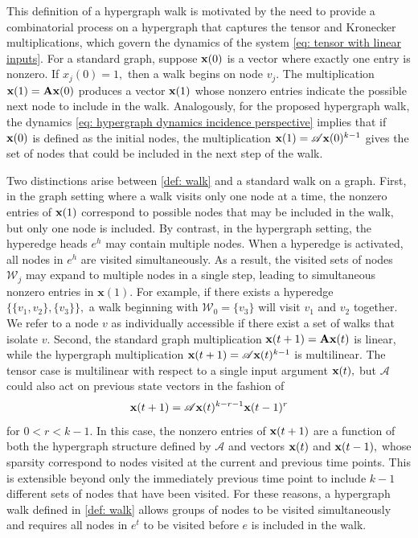 \documentclass[journal,twoside,web]{ieeecolor}
\begin{document}
This definition of a hypergraph walk is motivated by the need to provide a combinatorial process on a hypergraph that captures the tensor and Kronecker multiplications, which govern the dynamics of the system \eqref{eq: tensor with linear inputs}.
%
For a standard graph, suppose $\textbf x(0)$ is a vector where exactly one entry is nonzero. If $x_j(0)=1,$ then a walk begins on node $v_j.$ The multiplication $\textbf x(1)=\textbf{A}\textbf x(0)$ produces a vector $\textbf x(1)$ whose nonzero entries indicate the possible next node to include in the walk.
%
Analogously, for the proposed hypergraph walk, the dynamics \eqref{eq: hypergraph dynamics incidence perspective} implies that if $\textbf x(0)$ is defined as the initial nodes, the multiplication $\textbf x(1)=\mathscr{A}\textbf x(0)^{k-1}$ gives the set of nodes that could be included in the next step of the walk.



Two distinctions arise between \cref{def: walk} and a standard walk on a graph.
%
First, in the graph setting where a walk visits only one node at a time, the nonzero entries of $\textbf x(1)$ correspond to possible nodes that may be included in the walk, but only one node is included.
%
By contrast, in the hypergraph setting, the hyperedge heads $e^{h}$ may contain multiple nodes.
%
When a hyperedge is activated, all nodes in $e^{h}$ are visited simultaneously. As a result, the visited sets of nodes $\mathcal{W}_j$ may expand to multiple nodes in a single step, leading to simultaneous nonzero entries in $\textbf{x}(1)$.
%
For example, if there exists a hyperedge $\{\{v_1, v_2\}, \{v_3\}\},$ a walk beginning with $\mathcal{W}_0=\{v_3\}$ will visit $v_1$ and $v_2$ together.
%
We refer to a node $v$ as individually accessible if there exist a set of walks that isolate $v.$
%
Second, the standard graph multiplication $\textbf x(t+1)=\textbf{A}\textbf x(t)$ is linear, while the hypergraph multiplication $\textbf x(t+1)=\mathscr{A}\textbf x(t)^{k-1}$ is multilinear.
%
The tensor case is multilinear with respect to a single input argument $\textbf x(t),$ but $\mathscr{A}$ could also act on previous state vectors in the fashion of \[\textbf x(t+1)=\mathscr{A}\textbf x(t)^{k-r-1}\textbf x(t-1)^r\] for $0<r<k-1.$
%
In this case, the nonzero entries of $\textbf x(t+1)$ are a function of both the hypergraph structure defined by $\mathscr{A}$ and vectors $\textbf x(t)$ and $\textbf x(t-1),$ whose sparsity correspond to nodes visited at the current and previous time points.
%
This is extensible beyond only the immediately previous time point to include $k-1$ different sets of nodes that have been visited.
%
For these reasons, a hypergraph walk defined in \cref{def: walk} allows groups of nodes to be visited simultaneously and requires all nodes in $e^t$ to be visited before $e$ is included in the walk.
\end{document}

